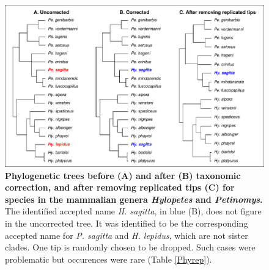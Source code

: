 \documentclass[11pt]{article}
\begin{document}
\begin{figure}[h!]
\centering
\includegraphics[scale=0.7]{figures/Case_studies/Case3}
\caption[Phylogenetic trees before (A) and after (B) taxonomic correction, and after removing replicated tips (C) for species in the mammalian genera \textit{Hylopetes} and \textit{Petinomys}]{\textbf{Phylogenetic trees before (A) and after (B) taxonomic correction, and after removing replicated tips (C) for species in the mammalian genera \textit{Hylopetes} and \textit{Petinomys}.} The identified accepted name \textit{H. sagitta}, in blue (B), does not figure in the uncorrected tree. It was identified to be the corresponding accepted name for \textit{P. sagitta} and \textit{H. lepidus}, which are not sister clades. One tip is randomly chosen to be dropped. Such cases were problematic but occurences were rare (Table \ref{Phyrep}).}
\label{case3}
\end{figure}

\pagebreak
\end{document}
